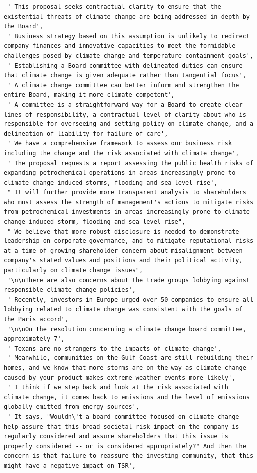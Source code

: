 \documentclass[
  letterpaper,
  DIV=11,
  numbers=noendperiod]{scrreprt}
\begin{document}
\begin{verbatim}
 ' This proposal seeks contractual clarity to ensure that the existential threats of climate change are being addressed in depth by the Board',
 ' Business strategy based on this assumption is unlikely to redirect company finances and innovative capacities to meet the formidable challenges posed by climate change and temperature containment goals',
 ' Establishing a Board committee with delineated duties can ensure that climate change is given adequate rather than tangential focus',
 ' A climate change committee can better inform and strengthen the entire Board, making it more climate-competent',
 ' A committee is a straightforward way for a Board to create clear lines of responsibility, a contractual level of clarity about who is responsible for overseeing and setting policy on climate change, and a delineation of liability for failure of care',
 ' We have a comprehensive framework to assess our business risk including the change and the risk associated with climate change',
 ' The proposal requests a report assessing the public health risks of expanding petrochemical operations in areas increasingly prone to climate change-induced storms, flooding and sea level rise',
 " It will further provide more transparent analysis to shareholders who must assess the strength of management's actions to mitigate risks from petrochemical investments in areas increasingly prone to climate change-induced storm, flooding and sea level rise",
 " We believe that more robust disclosure is needed to demonstrate leadership on corporate governance, and to mitigate reputational risks at a time of growing shareholder concern about misalignment between company's stated values and positions and their political activity, particularly on climate change issues",
 '\n\nThere are also concerns about the trade groups lobbying against responsible climate change policies',
 ' Recently, investors in Europe urged over 50 companies to ensure all lobbying related to climate change was consistent with the goals of the Paris accord',
 '\n\nOn the resolution concerning a climate change board committee, approximately 7',
 ' Texans are no strangers to the impacts of climate change',
 ' Meanwhile, communities on the Gulf Coast are still rebuilding their homes, and we know that more storms are on the way as climate change caused by your product makes extreme weather events more likely',
 ' I think if we step back and look at the risk associated with climate change, it comes back to emissions and the level of emissions globally emitted from energy sources',
 ' It says, "Wouldn\'t a board committee focused on climate change help assure that this broad societal risk impact on the company is regularly considered and assure shareholders that this issue is properly considered -- or is considered appropriately?" And then the concern is that failure to reassure the investing community, that this might have a negative impact on TSR',

\end{verbatim}
\end{document}
